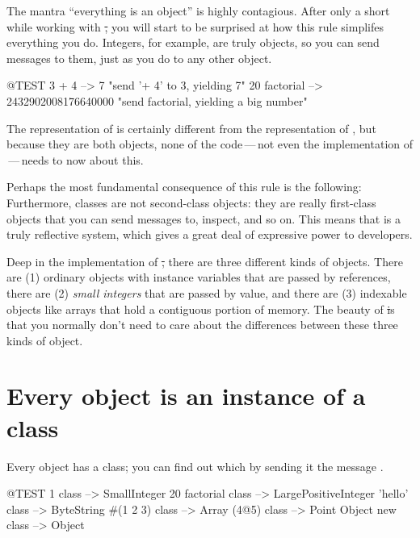 \documentclass[a4paper,10pt,twoside]{book}
\begin{document}

The mantra ``everything is an object'' is highly contagious.
After only a short while working with \st, you will start to be surprised at how this rule simplifes everything you do.
Integers, for example, are truly objects, so you can send messages to them, just as you do to any other object.

\begin{code}{@TEST}
3 + 4            --> 7    "send '+ 4' to 3, yielding 7"
20 factorial  --> 2432902008176640000   "send factorial, yielding a big number"
\end{code}

The representation of  is certainly different from the representation of , but because they are both objects, none of the code\,---\,not even the implementation of \,---\,needs to now about this.

Perhaps the most fundamental consequence of this rule is the following:
Furthermore, classes are not second-class objects: they are really first-class objects that you can send messages to, inspect, and so on.
This means that \squeak is a truly reflective system, which gives a great deal of expressive power to developers.

Deep in the implementation of \st, there are three different kinds of objects.  There are (1) ordinary objects with instance variables that are passed by references, there are (2) \emph{small integers} that are passed by value, and there are (3) indexable objects like arrays that hold a contiguous portion of memory.  The beauty of \st is that you normally don't need to care about the differences between these three kinds of object.

\section{Every object is an instance of a class}


Every object has a class; you can find out which by sending it the message .

\begin{code}{@TEST}
1 class                 --> SmallInteger
20 factorial class --> LargePositiveInteger
'hello' class          --> ByteString
#(1 2 3) class       --> Array
(4@5) class         --> Point
Object new class --> Object
\end{code}
\end{document}
